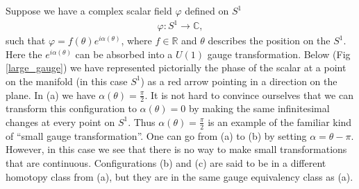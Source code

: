     Suppose we have a complex scalar field $\varphi$ defined on  $S^1$
    \begin{align}
        \varphi: S^1 \rightarrow \mathbb{C},
    \end{align}
    such that $\varphi = f(\theta) e^{i \alpha(\theta)}$, where $f\in \mathbb{R}$ and $\theta$ describes the position on the $S^1$. Here the $e ^{i \alpha (\theta)}$ can be absorbed into a $U(1)$ gauge transformation. Below (Fig \ref{large_gauge}) we have represented pictorially the phase of the scalar at a point on the manifold (in this case $S^1$) as a red arrow pointing in a direction on the plane. In (a) we have $\alpha(\theta) = \frac{\pi}{2}$. It is not hard to convince ourselves that we can transform this configuration to $\alpha(\theta) =0$ by making the same infinitesimal changes at every point on $S^1$. Thus $\alpha(\theta) = \frac{\pi}{2}$ is an example of the familiar kind of ``small gauge transformation''. One can go from (a) to (b) by setting $\alpha =\theta - \pi$. However, in this case we see that there is no way to make small transformations that are continuous. Configurations (b) and (c) are said to be in a different homotopy class from (a), but they are in the same gauge equivalency class as (a).
    



